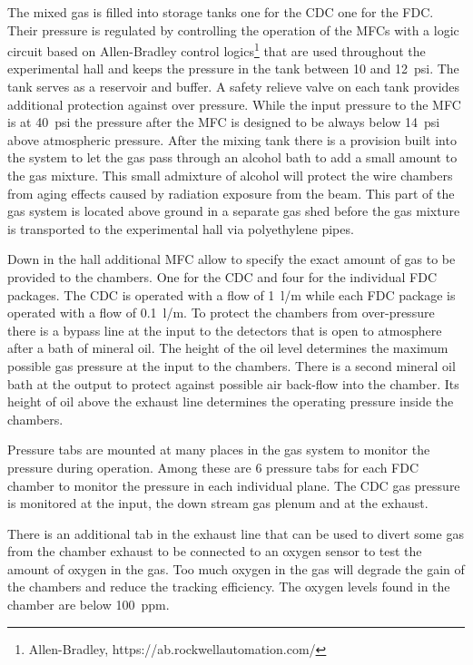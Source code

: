 The mixed gas is filled into storage tanks one for the CDC one for the FDC. Their pressure is
regulated by controlling the operation of the MFCs with a logic circuit based on Allen-Bradley control logics\footnote{Allen-Bradley, https://ab.rockwellautomation.com/}
that are used throughout the experimental hall and keeps
the pressure in the tank between 10 and 12~psi. The tank serves as a reservoir and buffer.
A safety relieve valve on each tank
provides additional protection against over pressure. While the input pressure to the MFC is at 40~psi the pressure after
the MFC is designed to be always below 14~psi above atmospheric pressure. After the mixing tank there is a provision
built into the system to let the gas pass through an alcohol bath to add a small amount to the gas mixture.
This small admixture of alcohol will protect the wire chambers from aging effects caused by radiation exposure from the beam.
This part of the gas system is located above ground in a separate gas shed before the gas mixture is transported
to the experimental hall via polyethylene pipes.

Down in the hall additional MFC allow to specify the exact amount of gas to be provided to the chambers. One for the CDC
and four for the individual FDC packages. The CDC is operated with a flow of 1~l/m while each FDC package is operated with
a flow of 0.1~l/m. To protect the chambers from over-pressure there is a bypass line at the input to the detectors that
is open to atmosphere after a bath of mineral oil. The height of the oil level determines the maximum possible gas pressure at
the input to the chambers. There is a second mineral oil bath at the output to protect against possible air back-flow into
the chamber. Its height of oil above the exhaust line determines the operating pressure inside the chambers.

Pressure tabs are mounted at many places in the gas system to monitor the pressure during operation. Among these are
6 pressure tabs for each FDC chamber to monitor the pressure in each individual plane. The CDC gas pressure is monitored
at the input, the down stream gas plenum and at the exhaust.

There is an additional tab in the exhaust line that can be used to divert some gas from the chamber exhaust to be connected
to an oxygen sensor to test the amount of oxygen in the gas. Too much oxygen in the gas will degrade the gain of
the chambers and reduce the tracking efficiency. The oxygen levels found in the chamber are below 100~ppm. 

